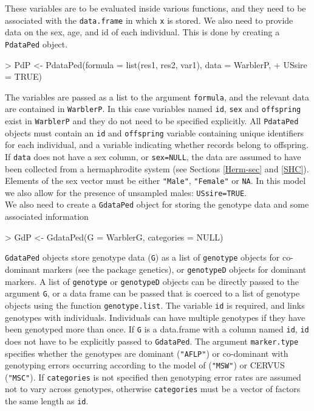 \documentclass{article}
\begin{document}
 These variables are to be evaluated inside various functions, and they need to be associated with the \texttt{data.frame} in which \texttt{x} is stored. We also need to provide data on the sex, age, and id of each individual.  This is done by creating a \texttt{PdataPed} object.

\begin{Schunk}
\begin{Sinput}
> PdP <- PdataPed(formula = list(res1, res2, var1), data = WarblerP, 
+     USsire = TRUE)
\end{Sinput}
\end{Schunk}

The variables are passed as a list to the argument \texttt{formula}, and the relevant data are contained in \texttt{WarblerP}.  In this case variables named \texttt{id}, \texttt{sex} and \texttt{offspring} exist in \texttt{WarblerP} and they do not need to be specified explicitly.  All \texttt{PdataPed} objects must contain an \texttt{id} and \texttt{offspring} variable containing unique identifiers for each individual, and a variable indicating whether records belong to offspring. If \texttt{data} does not have a sex column, or \texttt{sex=NULL}, the data are assumed to have been collected from a hermaphrodite system (see Sections \ref{Herm-sec} and \ref{SHC}). Elements of the sex vector must be either \texttt{"Male"}, \texttt{"Female"} or \texttt{NA}.  In this model we also allow for the presence of unsampled males: \texttt{USsire=TRUE}.\\

We also need to create a \texttt{GdataPed} object for storing the genotype data and some associated information

\begin{Schunk}
\begin{Sinput}
> GdP <- GdataPed(G = WarblerG, categories = NULL)
\end{Sinput}
\end{Schunk}

\texttt{GdataPed} objects store genotype data (\texttt{G}) as a list of \texttt{genotype} objects for co-dominant markers (see the package genetics), or \texttt{genotypeD} objects for dominant markers.  A list of \texttt{genotype} or \texttt{genotypeD} objects can be directly passed to the argument \texttt{G}, or a data frame can be passed that is coerced to a list of genotype objects using the function \texttt{genotype.list}. The variable \texttt{id} is required, and links genotypes with individuals.  Individuals can have multiple genotypes if they have been genotyped more than once.  If \texttt{G} is a data.frame with a column named \texttt{id}, \texttt{id} does not have to be explicitly passed to \texttt{GdataPed}.  The argument \texttt{marker.type} specifies whether the genotypes are dominant (\texttt{"AFLP"}) or co-dominant with genotyping errors occurring according to the model of \citet{Wang.2004} (\texttt{"MSW"}) or CERVUS \citep{Marshall.1998} (\texttt{"MSC"}).  If \texttt{categories} is not specified then genotyping error rates are assumed not to vary across genotypes, otherwise \texttt{categories} must be a vector of factors the same length as \texttt{id}.\\
\end{document}
